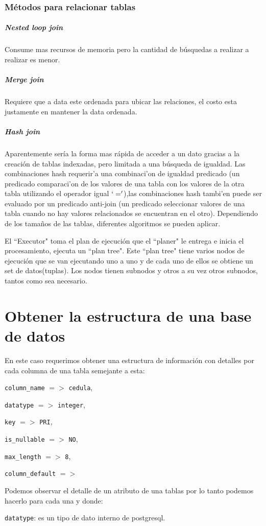 \subsubsection{M\'etodos para relacionar tablas}
\subparagraph{Nested loop join}
Consume mas recursos de memoria pero la cantidad de b\'usquedas a realizar a realizar es menor.
\subparagraph{Merge join}
Requiere que a data este ordenada para ubicar las relaciones, el costo esta justamente en mantener la data ordenada.
\subparagraph{Hash join}
Aparentemente ser\'ia la forma mas r\'apida de acceder a un dato gracias a la creaci\'on de tablas indexadas, pero limitada a una b\'usqueda de igualdad. Las combinaciones hash requerir'a una combinaci'on de igualdad predicado (un predicado comparaci'on de los valores de una tabla con los valores de la otra tabla utilizando el operador igual $`='$),las combinaciones hash tambi'en puede ser evaluado por un predicado anti-join (un predicado seleccionar valores de una tabla cuando no hay valores relacionados se encuentran en el otro). Dependiendo de los tama\~nos de las tablas, diferentes algoritmos se pueden aplicar.

El ``Executor" toma el plan de ejecuci\'on que el ``planer" le entrega e inicia el procesamiento, ejecuta un ``plan tree".
Este ``plan tree" tiene varios nodos de ejecuci\'on que se van ejecutando uno a uno y de cada uno de ellos se obtiene un set de datos(tuplas). Los nodos tienen subnodos y otros a su vez otros subnodos, tantos como sea necesario.
\section{Obtener la estructura de una base de datos}
En este caso requerimos obtener una estructura de informaci\'on con detalles por cada columna de una tabla semejante a esta:

\texttt{column\_name} $=>$ \texttt{cedula},
 
\texttt{datatype} $=>$ \texttt{integer}, 

\texttt{key} $=>$ \texttt{PRI},

\texttt{is\_nullable} $=>$ \texttt{NO},

\texttt{max\_length} $=>$ \texttt{8}, 

\texttt{column\_default} $=>$

Podemos observar el detalle de un atributo de una tablas por lo tanto podemos hacerlo para cada una y donde:

\texttt{datatype}: es un tipo de dato interno de postgresql.


